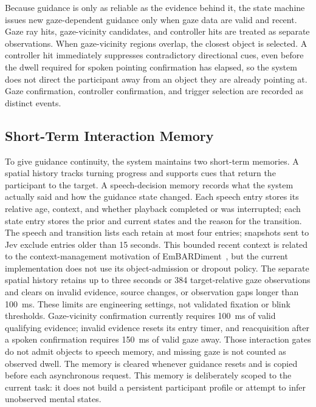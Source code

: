 \documentclass[11pt,letterpaper]{article}
\begin{document}
Because guidance is only as reliable as the evidence behind it, the state machine issues new gaze-dependent guidance only when gaze data are valid and recent. Gaze ray hits, gaze-vicinity candidates, and controller hits are treated as separate observations. When gaze-vicinity regions overlap, the closest object is selected. A controller hit immediately suppresses contradictory directional cues, even before the dwell required for spoken pointing confirmation has elapsed, so the system does not direct the participant away from an object they are already pointing at. Gaze confirmation, controller confirmation, and trigger selection are recorded as distinct events.

\subsection{Short-Term Interaction Memory}
To give guidance continuity, the system maintains two short-term memories. A spatial history tracks turning progress and supports cues that return the participant to the target. A speech-decision memory records what the system actually said and how the guidance state changed. Each speech entry stores its relative age, context, and whether playback completed or was interrupted; each state entry stores the prior and current states and the reason for the transition. The speech and transition lists each retain at most four entries; snapshots sent to Jev exclude entries older than 15 seconds. This bounded recent context is related to the context-management motivation of EmBARDiment~\cite{bovo2025embardiment}, but the current implementation does not use its object-admission or dropout policy. The separate spatial history retains up to three seconds or 384 target-relative gaze observations and clears on invalid evidence, source changes, or observation gaps longer than 100~ms. These limits are engineering settings, not validated fixation or blink thresholds. Gaze-vicinity confirmation currently requires 100~ms of valid qualifying evidence; invalid evidence resets its entry timer, and reacquisition after a spoken confirmation requires 150~ms of valid gaze away. Those interaction gates do not admit objects to speech memory, and missing gaze is not counted as observed dwell. The memory is cleared whenever guidance resets and is copied before each asynchronous request. This memory is deliberately scoped to the current task: it does not build a persistent participant profile or attempt to infer unobserved mental states.
\end{document}
